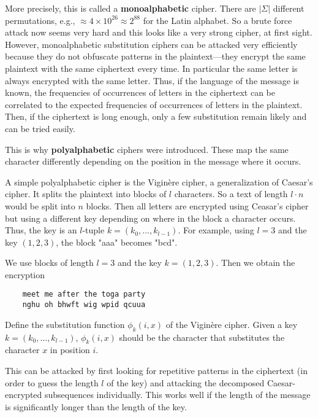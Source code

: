 More precisely, this is called a \textbf{monoalphabetic} cipher.
There are $|\Sigma|$ different permutations, e.g., $\approx 4\times 10^{26}\approx 2^{88}$ for the Latin alphabet.
So a brute force attack now seems very hard and this looks like a very strong cipher, at first sight. 
However, monoalphabetic substitution ciphers can be attacked very efficiently because they do not obfuscate patterns in the plaintext---they encrypt the same plaintext with the same ciphertext every time.
In particular the same letter is always encrypted with the same letter. 
Thus, if the language of the message is known, the frequencies of occurrences of letters in the ciphertext can be correlated to the expected frequencies of occurrences of letters in the plaintext.
Then, if the ciphertext is long enough, only a few substitution remain likely and can be tried easily.

This is why \textbf{polyalphabetic} ciphers were introduced.
These map the same character differently depending on the position in the message where it occurs.

A simple polyalphabetic cipher is the Vigin\`ere cipher, a generalization of Caesar's cipher.
It splits the plaintext into blocks of $l$ characters.
So a text of length $l\cdot n$ would be split into $n$ blocks.
Then all letters are encrypted using Ceasar's cipher but using a different key depending on where in the block a character occurs.
Thus, the key is an $l$-tuple $k=(k_0,\ldots,k_{l-1})$.
For example, using $l=3$ and the key $(1,2,3)$, the block "aaa" becomes "bcd". 

\begin{example}
 We use blocks of length $l=3$ and the key $k=(1,2,3)$.
 Then we obtain the encryption
  \begin{lstlisting}
    meet me after the toga party
    nghu oh bhwft wig wpid qcuua
  \end{lstlisting}
\end{example}

\begin{exercise}
Define the substitution function $\phi_k(i,x)$ of the Vigin\`ere cipher.
Given a key $k=(k_0,\ldots,k_{l-1})$, $\phi_k(i,x)$ should be the character that substitutes the character $x$ in position $i$.
\end{exercise}

This can be attacked by first looking for repetitive patterns in the ciphertext (in order to guess the length $l$ of the key) and attacking the decomposed Caesar-encrypted subsequences individually.
This works well if the length of the message is significantly longer than the length of the key. 

